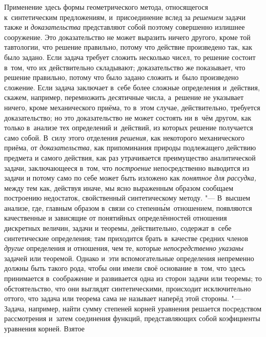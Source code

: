Применение здесь формы геометрического метода, относящегося к~синтетическим
предложениям, и~присоединение вслед за {\em решением} задачи также и {\em
доказательства} представляют собой поэтому совершенно излишнее сооружение. Это
доказательство не может выразить ничего другого, кроме той тавтологии, что
решение правильно, потому что действие произведено так, как было задано. Если
задача требует сложить несколько чисел, то решение состоит в~том, что их
действительно складывают; доказательство же показывает, что решение правильно,
потому что было задано сложить и~было произведено сложение. Если задача
заключает в~себе более сложные определения и~действия, скажем, например,
перемножить десятичные числа, а~решение не указывает ничего, кроме механического
приёма, то в~этом случае, действительно, требуется доказательство; но это
доказательство не может состоять ни в~чём другом, как только в~анализе тех
определений и~действий, из которых решение получается само собой. В~силу этого
отделения {\em решения,} как некоторого механического приёма, от
{\em доказательства,} как припоминания природы подлежащего действию предмета и
самого действия, как раз утрачивается преимущество аналитической задачи,
заключающееся в~том, что {\em построение} непосредственно выводится из задачи и
потому само по себе может быть изложено как {\em понятное для рассудка,} между
тем как, действуя иначе, мы ясно выраженным образом сообщаем построению
недостаток, свойственный синтетическому методу. "--- В~высшем анализе, где,
главным образом в~связи со степенн\'{ы}м~отношением, появляются качественные и
зависящие от понятийных определённостей отношения дискретных величин, задачи и
теоремы, действительно, содержат в~себе синтетические определения; там
приходится брать в~качестве средних членов {\em другие} определения и
отношения, чем те, которые {\em непосредственно указаны} задачей или теоремой.
Однако и~эти вспомогательные определения непременно должны быть такого рода,
чтобы они имели своё основание в~том, что здесь принимается в~соображение и
развивается одна из сторон задачи или теоремы; то обстоятельство, что они
выглядят синтетическими, происходит исключительно оттого, что задача или
теорема сама не называет наперёд этой стороны. "--- Задача, например, найти
сумму степеней корней уравнения решается посредством рассмотрения и~затем
соединения функций, представляющих собой коэфициенты уравнения корней. Взятое
